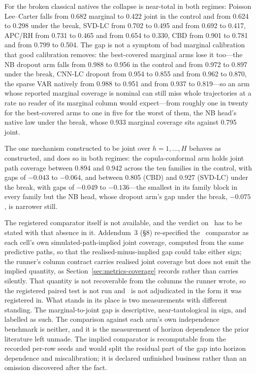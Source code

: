 For the broken classical natives the collapse is near-total in both
regimes: Poisson Lee--Carter falls from 0.682 marginal to 0.422 joint in
the control and from 0.624 to 0.298 under the break, SVD-LC from 0.702 to
0.495 and from 0.692 to 0.417, APC/RH from 0.731 to 0.465 and from 0.654
to 0.330, CBD from 0.901 to 0.781 and from 0.799 to 0.504. The gap is not
a symptom of bad marginal calibration that good calibration removes: the
best-covered marginal arms lose it too---the NB dropout arm falls from
0.988 to 0.956 in the control and from 0.972 to 0.897 under the break,
CNN-LC dropout from 0.954 to 0.855 and from 0.962 to 0.870, the sparse VAR
natively from 0.988 to 0.951 and from 0.937 to 0.819---so an arm whose
reported marginal coverage is nominal can still miss whole trajectories at
a rate no reader of its marginal column would expect---from roughly one in
twenty for the best-covered arms to one in five for the worst of them, the
NB head's native law under the break, whose 0.933 marginal coverage sits
against 0.795 joint.

The one mechanism constructed to be joint over $h=1,\dots,H$ behaves as
constructed, and does so in both regimes: the copula-conformal arm holds
joint path coverage between 0.894 and 0.942 across the ten families in the
control, with gaps of $-0.043$ to $-0.064$, and between 0.805 (CBD) and
0.927 (SVD-LC) under the break, with gaps of $-0.049$ to $-0.136$---the
smallest in its family block in every family but the NB head, whose
dropout arm's gap under the break, $-0.075$, is narrower still.

The registered comparator itself is not available, and the verdict on
\Hthree\ has to be stated with that absence in it. Addendum~3 (\S8)
re-specified the \Hthree\ comparator as each cell's own
simulated-path-implied joint coverage, computed from the same predictive
paths, so that the realised-minus-implied gap could take either sign; the
runner's column contract carries realised joint coverage but does not emit
the implied quantity, as Section~\ref{sec:metrics-coverage} records rather
than carries silently. That quantity is not recoverable from the columns
the runner wrote, so the registered paired test is not run and \Hthree\ is
not adjudicated in the form it was registered in. What stands in its place
is two measurements with different standing. The marginal-to-joint gap is
descriptive, near-tautological in sign, and labelled as such. The
comparison against each arm's own independence benchmark is neither, and
it is the measurement of horizon dependence the prior literature left
unmade. The implied comparator is recomputable from the recorded per-row
seeds and would split the residual part of the gap into horizon dependence
and miscalibration; it is declared unfinished business rather than an
omission discovered after the fact.

